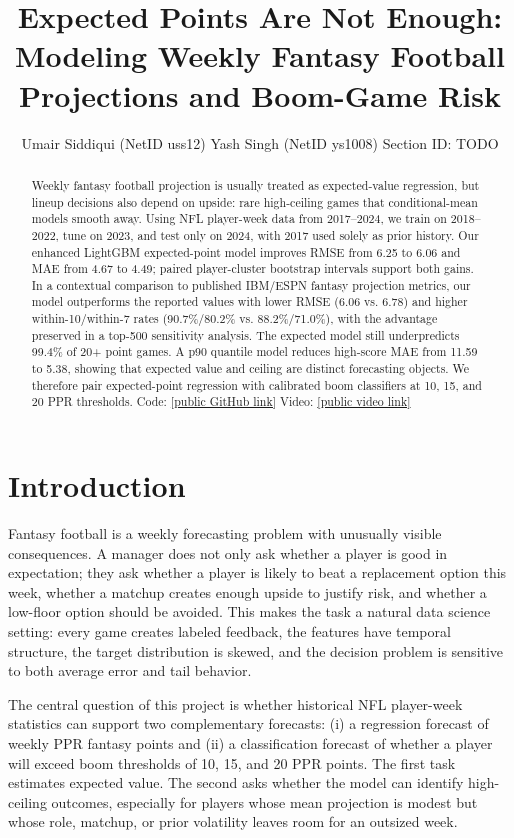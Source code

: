 \documentclass{article}
\title{Expected Points Are Not Enough: Modeling Weekly Fantasy Football Projections and Boom-Game Risk}
\author{%
  Umair Siddiqui (NetID uss12) \quad
  Yash Singh (NetID ys1008) \quad
  Section ID: TODO
}
\begin{document}
\maketitle

\begin{abstract}
Weekly fantasy football projection is usually treated as expected-value regression, but lineup decisions also depend on upside: rare high-ceiling games that conditional-mean models smooth away. Using NFL player-week data from 2017--2024, we train on 2018--2022, tune on 2023, and test only on 2024, with 2017 used solely as prior history. Our enhanced LightGBM expected-point model improves RMSE from 6.25 to 6.06 and MAE from 4.67 to 4.49; paired player-cluster bootstrap intervals support both gains. In a contextual comparison to published IBM/ESPN fantasy projection metrics, our model outperforms the reported values with lower RMSE (6.06 vs. 6.78) and higher within-10/within-7 rates (90.7\%/80.2\% vs. 88.2\%/71.0\%), with the advantage preserved in a top-500 sensitivity analysis. The expected model still underpredicts 99.4\% of 20+ point games. A p90 quantile model reduces high-score MAE from 11.59 to 5.38, showing that expected value and ceiling are distinct forecasting objects. We therefore pair expected-point regression with calibrated boom classifiers at 10, 15, and 20 PPR thresholds. Code: \url{[public GitHub link]}
Video: \url{[public video link]}
\end{abstract}
\enlargethispage{4\baselineskip}

\section{Introduction}
Fantasy football is a weekly forecasting problem with unusually visible consequences. A manager does not only ask whether a player is good in expectation; they ask whether a player is likely to beat a replacement option this week, whether a matchup creates enough upside to justify risk, and whether a low-floor option should be avoided. This makes the task a natural data science setting: every game creates labeled feedback, the features have temporal structure, the target distribution is skewed, and the decision problem is sensitive to both average error and tail behavior.

The central question of this project is whether historical NFL player-week statistics can support two complementary forecasts: (i) a regression forecast of weekly PPR fantasy points and (ii) a classification forecast of whether a player will exceed boom thresholds of 10, 15, and 20 PPR points. The first task estimates expected value. The second asks whether the model can identify high-ceiling outcomes, especially for players whose mean projection is modest but whose role, matchup, or prior volatility leaves room for an outsized week.
\end{document}
